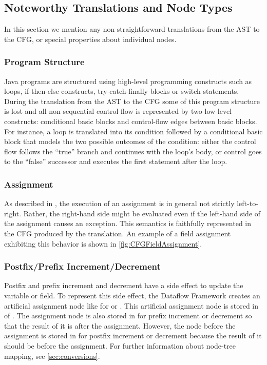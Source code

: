 \subsection{Noteworthy Translations and Node Types}
\label{sec:noteworthy-translations}

In this section we mention any non-straightforward translations from the AST to
the CFG, or special properties about individual nodes.


\subsubsection{Program Structure}
\label{sec:prog-structure}

Java programs are structured using high-level programming constructs
such as loops, if-then-else constructs,
try-catch-finally blocks or switch statements.  During the translation
from the AST to the CFG some of this program structure is lost and all
non-sequential control flow is represented by two low-level
constructs: conditional basic blocks and control-flow edges between
basic blocks. For instance, a  loop is translated into its
condition followed by a conditional basic block that models the two
possible outcomes of the condition: either the control flow follows
the ``true'' branch and continues with the loop's body, or control goes to the
``false'' successor and executes the first statement after the loop.


\subsubsection{Assignment}

As described in , the execution of an assignment is in
general not strictly left-to-right. Rather, the right-hand side might
be evaluated even if the left-hand side of the assignment causes an
exception. This semantics is faithfully represented in the CFG
produced by the translation.  An example of a field assignment
exhibiting this behavior is shown in \autoref{fig:CFGFieldAssignment}.


\subsubsection{Postfix/Prefix Increment/Decrement}
\label{sec:postpre-incdec}
Postfix and prefix increment and decrement have a side effect to
update the variable or field. To represent this side effect, the Dataflow
Framework creates an artificial assignment node like 
for  or . This artificial assignment node is stored
in  of . The assignment
node is also stored in  for prefix increment or decrement
so that the result of it is after the assignment. However, the node before
the assignment is stored in  for postfix increment or decrement
because the result of it should be before the assignment. For further information
about node-tree mapping, see \autoref{sec:conversions}.


